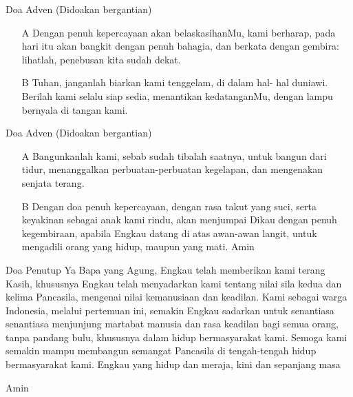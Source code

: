 \documentclass[11pt]{beamer}
\begin{document}
\begin{frame}{Doa Adven (Didoakan bergantian)}
	\begin{enumerate}
		\item [A] Dengan penuh kepercayaan akan belaskasihanMu, kami
		berharap, pada hari itu akan bangkit dengan penuh
		bahagia, dan berkata dengan gembira: lihatlah, penebusan
		kita sudah dekat.
		\item [B] Tuhan, janganlah biarkan kami tenggelam, di dalam hal-
		hal duniawi. Berilah kami selalu siap sedia, menantikan
		kedatanganMu, dengan lampu bernyala di tangan kami.
\end{enumerate}
\end{frame}

\begin{frame}{Doa Adven (Didoakan bergantian)}
	\begin{enumerate}
		\item [A] Bangunkanlah kami, sebab sudah tibalah saatnya, untuk
		bangun dari tidur, menanggalkan perbuatan-perbuatan
		kegelapan, dan mengenakan senjata terang.
		\item [B] Dengan doa penuh kepercayaan, dengan rasa takut yang
		suci, serta keyakinan sebagai anak kami rindu, akan
		menjumpai Dikau dengan penuh kegembiraan, apabila
		Engkau datang di atas awan-awan langit, untuk mengadili
		orang yang hidup, maupun yang mati. Amin
	\end{enumerate}
\end{frame}

\begin{frame}{Doa Penutup}
Ya Bapa yang Agung, Engkau telah memberikan kami
terang Kasih, khususnya Engkau telah menyadarkan kami
tentang nilai sila kedua dan kelima Pancasila, mengenai
nilai kemanusiaan dan keadilan. Kami sebagai warga
Indonesia, melalui pertemuan ini, semakin Engkau
sadarkan untuk senantiasa senantiasa menjunjung
martabat manusia dan rasa keadilan bagi semua orang,
tanpa pandang bulu, khususnya dalam hidup
bermasyarakat kami. Semoga kami semakin mampu
membangun semangat Pancasila di tengah-tengah hidup
bermasyarakat kami. Engkau yang hidup dan meraja, kini
dan sepanjang masa

Amin
\end{frame}
\end{document}
